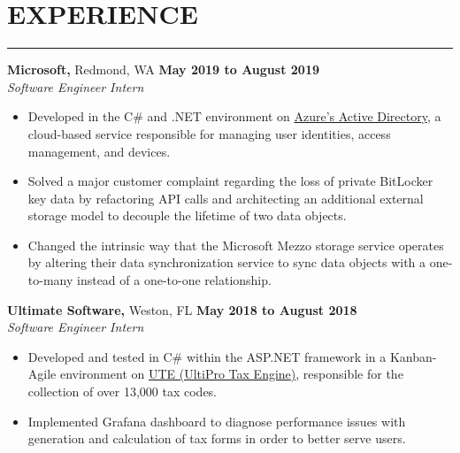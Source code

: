 \section*{EXPERIENCE}

\hrule \relax
\sectionheaderspace

\noindent \textbf{Microsoft,} Redmond, WA \hfill\textbf{May 2019 to August 2019}\\
\textit{Software Engineer Intern}
\begin{itemize}[noitemsep,nolistsep, label = {-}]
	\item Developed in the C\# and .NET environment on \href{https://docs.microsoft.com/en-us/azure/active-directory/fundamentals/active-directory-whatis}{Azure's Active Directory}, a cloud-based service responsible for managing user identities, access management, and devices.
	\item Solved a major customer complaint regarding the loss of private BitLocker key data by refactoring API calls and architecting an additional external storage model to decouple the lifetime of two data objects.
	\item Changed the intrinsic way that the Microsoft Mezzo storage service operates by altering their data synchronization service to sync data objects with a one-to-many instead of a one-to-one relationship.
\end{itemize}
\subsectionspace

\noindent \textbf{Ultimate Software,} Weston, FL \hfill\textbf{May 2018 to August 2018}\\
\textit{Software Engineer Intern}
\begin{itemize}[noitemsep,nolistsep, label = {-}]
	\item Developed and tested in C\# within the ASP.NET framework in a Kanban-Agile environment on \href{https://www.ultimatesoftware.com/UltiPro-Solution-Features-Payment-Services}{UTE (UltiPro Tax Engine)}, responsible for the collection of over 13,000 tax codes.
	\item Implemented Grafana dashboard to diagnose performance issues with generation and calculation of tax forms in order to better serve users.
\end{itemize}
\subsectionspace